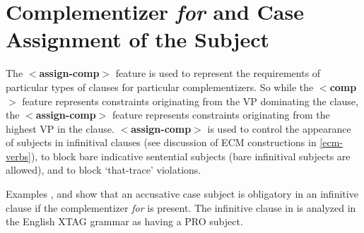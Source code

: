 
\section{Complementizer {\it for\/} and Case Assignment of the Subject}
\label{for-complementizer}

The {\bf $<$assign-comp$>$} feature is used to represent the
requirements of particular types of clauses for particular
complementizers.  So while the {\bf $<$comp$>$} feature represents
constraints originating from the VP dominating the clause, the {\bf
$<$assign-comp$>$} feature represents constraints originating from the
highest VP in the clause. {\bf $<$assign-comp$>$} is used to control
the appearance of subjects in infinitival clauses (see discussion of
ECM constructions in \ref{ecm-verbs}), to block bare indicative
sentential subjects (bare infinitival subjects are allowed), and to
block `that-trace' violations.

Examples ,  and  show that an accusative
case subject is obligatory in an infinitive clause if the
complementizer {\it for\/} is present. The infinitive clause in
 is analyzed in the English XTAG grammar as
having a PRO subject.  


 

